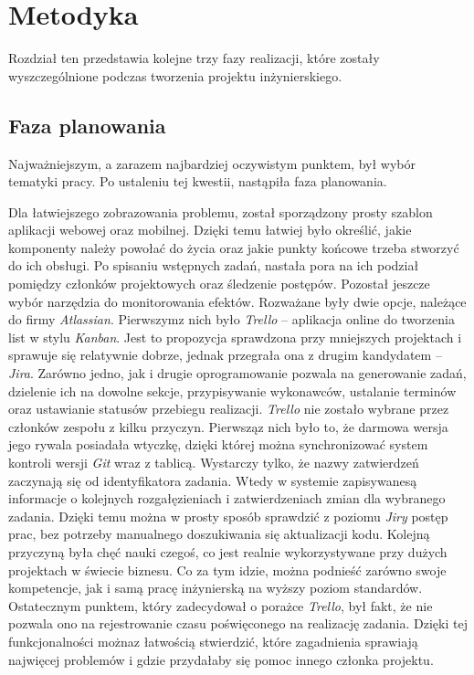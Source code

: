 \documentclass[twoside]{projektInzynierskiMS}
\numberwithin{figure}{section}
\begin{document}
\section{Metodyka}
Rozdział ten przedstawia kolejne trzy fazy realizacji, które zostały wyszczególnione podczas tworzenia projektu inżynierskiego.
\subsection{Faza planowania}
Najważniejszym, a zarazem najbardziej oczywistym punktem, był wybór tematyki pracy. Po ustaleniu tej kwestii, nastąpiła faza planowania. 

Dla łatwiejszego zobrazowania problemu, został sporządzony prosty szablon aplikacji webowej oraz mobilnej. Dzięki temu łatwiej było określić, jakie komponenty należy powołać do życia oraz jakie punkty końcowe trzeba stworzyć do ich obsługi. 
Po spisaniu wstępnych zadań, nastała pora na ich podział pomiędzy członków projektowych oraz śledzenie postępów. Pozostał jeszcze wybór narzędzia do monitorowania efektów. Rozważane były dwie opcje, należące do firmy \textit{Atlassian}. Pierwszym\linebreak z nich było \textit{Trello} – aplikacja online do tworzenia list w stylu \textit{Kanban}. Jest to propozycja sprawdzona przy mniejszych projektach i sprawuje się relatywnie dobrze, jednak przegrała ona z drugim kandydatem – \textit{Jira}. Zarówno jedno, jak i drugie oprogramowanie pozwala na generowanie zadań, dzielenie ich na dowolne sekcje, przypisywanie wykonawców, ustalanie terminów oraz ustawianie statusów przebiegu realizacji. \textit{Trello} nie zostało wybrane przez członków zespołu z kilku przyczyn. Pierwszą\linebreak z nich było to, że darmowa wersja jego rywala posiadała wtyczkę, dzięki której można synchronizować system kontroli wersji \textit{Git} wraz z tablicą. Wystarczy tylko, że nazwy zatwierdzeń zaczynają się od identyfikatora zadania. Wtedy w systemie zapisywane\linebreak są informacje o kolejnych rozgałęzieniach i zatwierdzeniach zmian dla wybranego zadania. Dzięki temu można w prosty sposób sprawdzić z poziomu \textit{Jiry} postęp prac, bez potrzeby manualnego doszukiwania się aktualizacji kodu. Kolejną przyczyną była chęć nauki czegoś, co jest realnie wykorzystywane przy dużych projektach w świecie biznesu. Co za tym idzie, można podnieść zarówno swoje kompetencje, jak i samą pracę inżynierską na wyższy poziom standardów. Ostatecznym punktem, który zadecydował o porażce \textit{Trello}, był fakt, że nie pozwala ono na rejestrowanie czasu poświęconego na realizację zadania. Dzięki tej funkcjonalności można\linebreak z łatwością stwierdzić, które zagadnienia sprawiają najwięcej problemów i gdzie przydałaby się pomoc innego członka projektu.
\end{document}
